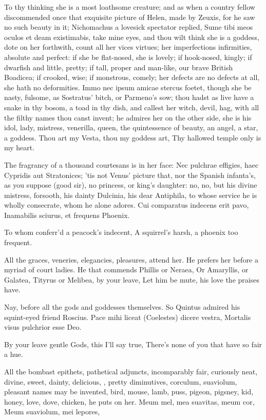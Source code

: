To thy thinking she is a most loathsome creature; and as when a country
fellow discommended once that exquisite picture of Helen, made by
Zeuxis, for he saw no such beauty in it; Nichomachus a lovesick
spectator replied, Sume tibi meos oculos et deam existimabis, take mine
eyes, and thou wilt think she is a goddess, dote on her forthwith,
count all her vices virtues; her imperfections infirmities, absolute
and perfect: if she be flat-nosed, she is lovely; if hook-nosed,
kingly; if dwarfish and little, pretty; if tall, proper and man-like,
our brave British Boadicea; if crooked, wise; if monstrous, comely; her
defects are no defects at all, she hath no deformities. Immo nec ipsum
amicae stercus foetet, though she be nasty, fulsome, as Sostratus'
bitch, or Parmeno's sow; thou hadst as live have a snake in thy bosom,
a toad in thy dish, and callest her witch, devil, hag, with all the
filthy names thou canst invent; he admires her on the other side, she
is his idol, lady, mistress, venerilla, queen, the quintessence
of beauty, an angel, a star, a goddess.
Thou art my Vesta, thou my goddess art,
Thy hallowed temple only is my heart.

The fragrancy of a thousand courtesans is in her face: Nec
pulchrae effigies, haec Cypridis aut Stratonices; 'tis not Venus'
picture that, nor the Spanish infanta's, as you suppose (good sir), no
princess, or king's daughter: no, no, but his divine mistress,
forsooth, his dainty Dulcinia, his dear Antiphila, to whose service he
is wholly consecrate, whom he alone adores.
Cui comparatus indecens erit pavo,
Inamabilis sciurus, et frequens Phoenix.

To whom conferr'd a peacock's indecent,
A squirrel's harsh, a phoenix too frequent.

All the graces, veneries, elegancies, pleasures, attend her. He prefers
her before a myriad of court ladies.
He that commends Phillis or Neraea,
Or Amaryllis, or Galatea,
Tityrus or Melibea, by your leave,
Let him be mute, his love the praises have.

Nay, before all the gods and goddesses themselves. So Quintus
\Catullus{} admired his squint-eyed friend Roscius.
Pace mihi liceat (Coelestes) dicere vestra,
Mortalis visus pulchrior esse Deo.

By your leave gentle Gods, this I'll say true,
There's none of you that have so fair a hue.

All the bombast epithets, pathetical adjuncts, incomparably fair,
curiously neat, divine, sweet, dainty, delicious, \etc{}, pretty
diminutives, corculum, suaviolum, \etc{} pleasant names may be invented,
bird, mouse, lamb, puss, pigeon, pigsney, kid, honey, love, dove,
chicken, \etc{} he puts on her.
Meum mel, mea suavitas, meum cor,
Meum suaviolum, mei lepores,


